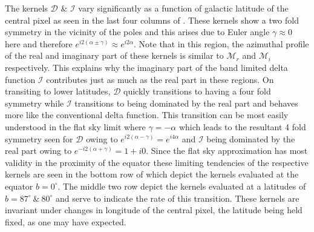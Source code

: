 %
The kernels $\mathcal{D}$ \& $\mathcal{I}$ vary significantly as a function of galactic latitude of the central pixel as seen in the last four columns of . These kernels show a two fold symmetry in the vicinity of the poles and this arises due to Euler angle $\gamma \approx 0$ here and therefore $e^{i2(\alpha \pm \gamma)} \approx e^{i2\alpha}$. Note that in this region, the azimuthal profile of the real and imaginary part of these kernels  is similar to $\mathcal{M}_r$ and $\mathcal{M}_i$ respectively.  This explains why the imaginary part of the band limited delta function $\mathcal{I}$ contributes just as much as the real part in these regions. On transiting to lower latitudes, $\mathcal{D}$ quickly transitions to having a four fold symmetry while $\mathcal{I}$ transitions to being dominated by the real part and behaves more like the conventional delta function. This transition can be most easily understood in the flat sky limit where $\gamma = -\alpha$ which leads to the resultant 4 fold symmetry seen for $\mathcal{D}$ owing to $e^{i2(\alpha - \gamma)} =e^{i4\alpha}$ and $\mathcal{I}$ being dominated by the real part owing to $e^{-i2(\alpha + \gamma)} =1 + i0$. Since the flat sky approximation has most validity in the proximity of the equator these limiting tendencies of the respective kernels are seen in the bottom row of  which depict the kernels evaluated at the equator $b=0^{\circ}$. The middle two row depict the kernels evaluated at a latitudes of $b=87^{\circ}~\&~ 80^{\circ}$ and serve to indicate the rate of this transition. These kernels are invariant under changes in longitude of the central pixel, the latitude being held fixed, as one may have expected.

